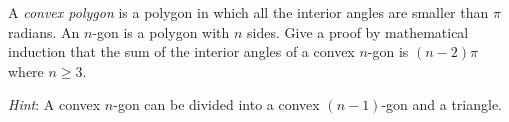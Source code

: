 \documentclass[a4paper]{exam}
\begin{document}
\begin{questions}
\question A \textit{convex polygon} is a polygon in which all the interior angles are smaller than $\pi$ radians. An $n$-gon is a polygon with $n$ sides. Give a proof by mathematical induction that the sum of the interior angles of a convex $n$-gon is $(n-2)\pi$ where $n\ge 3$. 

  \textit{Hint}: A convex $n$-gon can be divided into a convex $(n-1)$-gon and a triangle.
  \begin{solution}
  \end{solution}
  

\end{questions}
\end{document}
